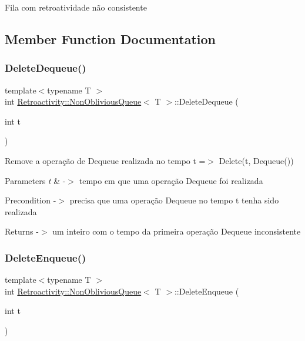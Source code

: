 Fila com retroatividade não consistente 

\subsection{Member Function Documentation}
\mbox{\label{classRetroactivity_1_1NonObliviousQueue_a18ae9cd695ecce640c2fc9986f05cecf}} 
\subsubsection{\texorpdfstring{Delete\+Dequeue()}{DeleteDequeue()}}
{\footnotesize\ttfamily template$<$typename T $>$ \\
int \hyperlink{classRetroactivity_1_1NonObliviousQueue}{Retroactivity\+::\+Non\+Oblivious\+Queue}$<$ T $>$\+::Delete\+Dequeue (\begin{DoxyParamCaption}\item[{int}]{t }\end{DoxyParamCaption})}

Remove a operação de Dequeue realizada no tempo t =$>$ Delete(t, Dequeue())


\begin{DoxyParams}{Parameters}
{\em t} & -\/$>$ tempo em que uma operação Dequeue foi realizada \\
\hline
\end{DoxyParams}
\begin{DoxyPrecond}{Precondition}
-\/$>$ precisa que uma operação Dequeue no tempo t tenha sido realizada 
\end{DoxyPrecond}
\begin{DoxyReturn}{Returns}
-\/$>$ um inteiro com o tempo da primeira operação Dequeue inconsistente 
\end{DoxyReturn}
\mbox{\label{classRetroactivity_1_1NonObliviousQueue_a3930425303a0a5c11a0cf0770ff30717}} 
\subsubsection{\texorpdfstring{Delete\+Enqueue()}{DeleteEnqueue()}}
{\footnotesize\ttfamily template$<$typename T $>$ \\
int \hyperlink{classRetroactivity_1_1NonObliviousQueue}{Retroactivity\+::\+Non\+Oblivious\+Queue}$<$ T $>$\+::Delete\+Enqueue (\begin{DoxyParamCaption}\item[{int}]{t }\end{DoxyParamCaption})}

